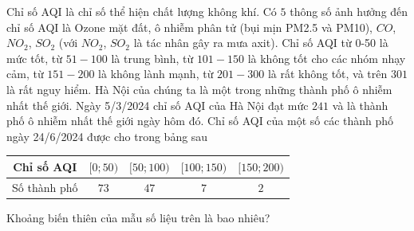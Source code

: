\begin{ex}%
	Chỉ số AQI là chỉ số thể hiện chất lượng không khí. Có $5$ thông số ảnh hưởng đến chỉ số AQI là Ozone mặt đất, ô nhiễm phân tử (bụi mịn PM2.5 và PM10), $CO$, $NO_2$, $SO_2$ (với $NO_2$, $SO_2$ là tác nhân gây ra mưa axit). Chỉ số AQI từ 0-50 là mức tốt, từ $51-100$ là trung bình, từ $101-150$ là không tốt cho các nhóm nhạy cảm, từ $151-200$ là không lành mạnh, từ $201-300$ là rất không tốt, và trên $301$ là rất nguy hiểm. Hà Nội của chúng ta là một trong những thành phố ô nhiễm nhất thế giới. Ngày 5/3/2024 chỉ số AQI của Hà Nội đạt mức $241$ và là thành phố ô nhiễm nhất thế giới ngày hôm đó. Chỉ số AQI của một số các thành phố ngày 24/6/2024 được cho trong bảng sau
	\begin{center}
		\begin{tabular}{|c|c|c|c|c|}
			\hline
			Chỉ số AQI&$[0;50)$&$[50;100)$&$[100;150)$&$[150;200)$\\
			\hline
			Số thành phố&$73$&$47$&$7$&$2$\\
			\hline
		\end{tabular}
	\end{center}	
	Khoảng biến thiên của mẫu số liệu trên là bao nhiêu?
\end{ex}

